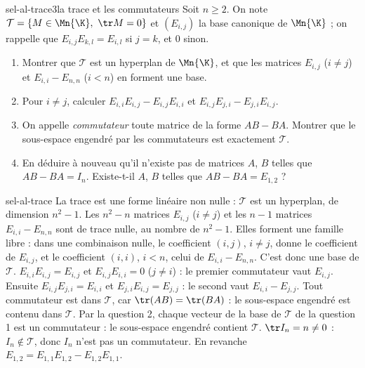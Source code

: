 \begin{exo}{sel-al-trace}{3}{la trace et les commutateurs}
Soit $n\geq2$. On note $\mathcal T=\{M\in\Mn{\K},\ \tr M=0\}$ et $(E_{i,j})$ la base canonique de $\Mn{\K}$ ; on rappelle que
$E_{i,j}E_{k,l}=E_{i,l}$ si $j=k$, et $0$ sinon.
\begin{enumerate}
\item Montrer que $\mathcal T$ est un hyperplan de $\Mn{\K}$, et que les matrices $E_{i,j}$ ($i\neq j$) et $E_{i,i}-E_{n,n}$ ($i<n$) en
forment une base.
\item Pour $i\neq j$, calculer $E_{i,i}E_{i,j}-E_{i,j}E_{i,i}$ et $E_{i,j}E_{j,i}-E_{j,i}E_{i,j}$.
\item On appelle \emph{commutateur} toute matrice de la forme $AB-BA$. Montrer que le sous-espace engendré par les commutateurs est
exactement $\mathcal T$.
\item En déduire à nouveau qu'il n'existe pas de matrices $A$, $B$ telles que $AB-BA=I_n$. Existe-t-il $A$, $B$ telles que
$AB-BA=E_{1,2}$ ?
\end{enumerate}
\end{exo}

\begin{corrige}{sel-al-trace}
 La trace est une forme linéaire non nulle : $\mathcal T$ est un hyperplan, de dimension $n^2-1$. Les $n^2-n$ matrices $E_{i,j}$
($i\neq j$) et les $n-1$ matrices $E_{i,i}-E_{n,n}$ sont de trace nulle, au nombre de $n^2-1$. Elles forment une famille libre : dans
une combinaison nulle, le coefficient $(i,j)$, $i\neq j$, donne le coefficient de $E_{i,j}$, et le coefficient $(i,i)$, $i<n$, celui de
$E_{i,i}-E_{n,n}$. C'est donc une base de $\mathcal T$.
 $E_{i,i}E_{i,j}=E_{i,j}$ et $E_{i,j}E_{i,i}=0$ ($j\neq i$) : le premier commutateur vaut $E_{i,j}$. Ensuite $E_{i,j}E_{j,i}=E_{i,i}$
et $E_{j,i}E_{i,j}=E_{j,j}$ : le second vaut $E_{i,i}-E_{j,j}$.
 Tout commutateur est dans $\mathcal T$, car $\tr(AB)=\tr(BA)$ : le sous-espace engendré est contenu dans $\mathcal T$. Par la
question 2, chaque vecteur de la base de $\mathcal T$ de la question 1 est un commutateur : le sous-espace engendré contient $\mathcal T$.
 $\tr I_n=n\neq0$ : $I_n\notin\mathcal T$, donc $I_n$ n'est pas un commutateur. En revanche $E_{1,2}=E_{1,1}E_{1,2}-E_{1,2}E_{1,1}$.
\end{corrige}

